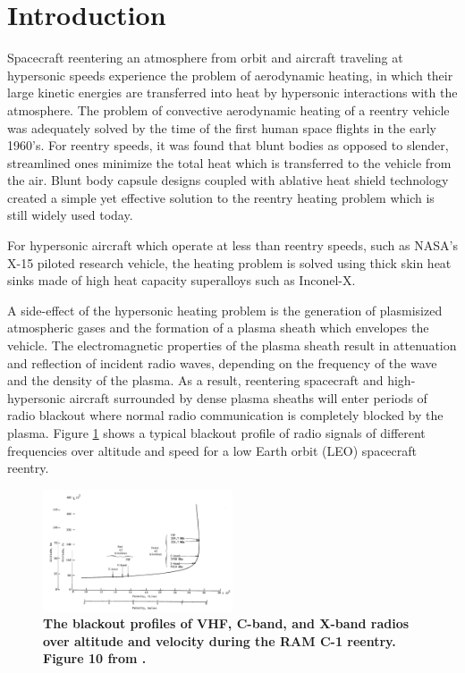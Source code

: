 \documentclass[twocolumn]{article}
\begin{document}
\section{Introduction}
	Spacecraft reentering an atmosphere from orbit and aircraft traveling at hypersonic speeds experience the problem of aerodynamic heating, in which their large kinetic energies are transferred into heat by hypersonic interactions with the atmosphere.
	The problem of convective aerodynamic heating of a reentry vehicle was adequately solved by the time of the first human space flights in the early 1960's.
	For reentry speeds, it was found that blunt bodies as opposed to slender, streamlined ones minimize the total heat which is transferred to the vehicle from the air.\cite{allen_study_1958}
	Blunt body capsule designs coupled with ablative heat shield technology created a simple yet effective solution to the reentry heating problem which is still widely used today.
	
	For hypersonic aircraft which operate at less than reentry speeds, such as NASA's X-15 piloted research vehicle, the heating problem is solved using thick skin heat sinks made of high heat capacity superalloys such as Inconel-X.\cite{stillwell_x-15_1965}
	
	A side-effect of the hypersonic heating problem is the generation of plasmisized atmospheric gases and the formation of a plasma sheath which envelopes the vehicle.
	The electromagnetic properties of the plasma sheath result in attenuation and reflection of incident radio waves, depending on the frequency of the wave and the density of the plasma.
	As a result, reentering spacecraft and high-hypersonic aircraft surrounded by dense plasma sheaths will enter periods of radio blackout where normal radio communication is completely blocked by the plasma.
	Figure \ref{fig:RAMCBlackout} shows a typical blackout profile of radio signals of different frequencies over altitude and speed for a low Earth orbit (LEO) spacecraft reentry.
	
	\begin{figure}[h]
		\centering
		\includegraphics[width = 0.5\textwidth]{Images/RAMC_BlackoutProfile.png}
		\caption{\textbf{The blackout profiles of VHF, C-band, and X-band radios over altitude and velocity during the RAM C-1 reentry. Figure 10 from \cite{akey_radio_1970}.}}
		\label{fig:RAMCBlackout}
	\end{figure}
	
\end{document}

